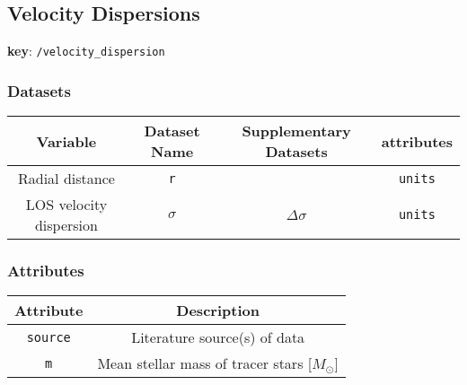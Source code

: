 \subsection{Velocity Dispersions}

\textbf{key}: \texttt{/velocity\_dispersion}

\subsubsection{Datasets}

\begin{center}
\begin{tabular}{ | c | c | c | c | }
    \hline
    Variable & Dataset Name & Supplementary Datasets &  attributes \\
    \hline\hline
    Radial distance & \texttt{r} & & \texttt{units} \\
    \hline
    LOS velocity dispersion & \texttt{\(\sigma\)} & \texttt{\(\Delta\sigma\)} &
    \texttt{units}\\
    \hline
\end{tabular}
\end{center}

\subsubsection{Attributes}


\begin{center}
\begin{tabular}{ | c | c | }
    \hline
    Attribute & Description \\
    \hline\hline
    \texttt{source} & Literature source(s) of data \\
    \hline
    \texttt{m} & Mean stellar mass of tracer stars [\(M_\odot\)] \\
    \hline
\end{tabular}
\end{center}

